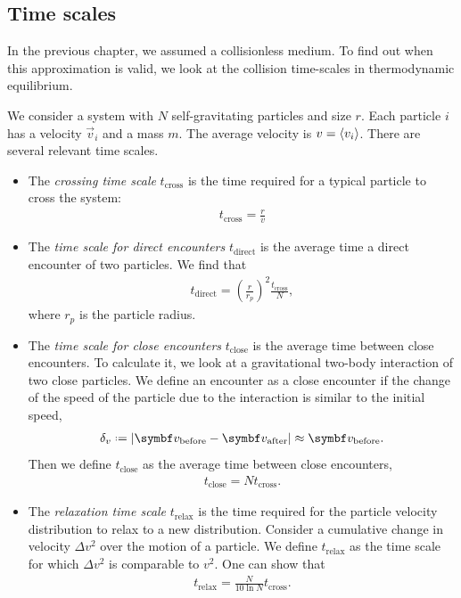 \subsection{Time scales}
\label{ssec:time-scales}

In the previous chapter, we assumed a collisionless medium. To find out when this approximation is valid, we look at the collision time-scales in thermodynamic equilibrium.

We consider a system with $N$ self-gravitating particles and size $r$.
Each particle $i$ has a velocity $\vec{v}_i$ and a mass $m$. The average velocity is $v = \left\langle v_i \right\rangle$.
There are several relevant time scales.
\begin{itemize}
	\item The \emph{crossing time scale} $t_\text{cross}$ is the time required for a typical particle to cross the system:
	\begin{align*}
		t_\text{cross} = \frac{r}{v}
	\end{align*}

	\item The \emph{time scale for direct encounters} $t_\text{direct}$ is the average time a direct encounter of two particles. We find that 
	\begin{align*}
		t_\text{direct}
		=  \left( \frac{r}{r_p} \right) ^2\frac{t_\text{cross}}{N},
	\end{align*}
	where $r_p$ is the particle radius. 
	\item The \emph{time scale for close encounters} $t_\text{close}$ is the average time between close encounters.
	To calculate it, we look at a gravitational two-body interaction of two close particles.
	We define an encounter as a close encounter if the change of the speed of the particle due to the interaction is similar to the initial speed,
	\begin{align*}
		\delta_v
		\defeq \abs*{\vec{v}_\text{before} - \vec{v}_\text{after}}
		\approx \vec{v}_\text{before}.
	\end{align*}
	Then we define $t_\text{close}$ as the average time between close encounters,
	\begin{align*}
		t_\text{close}
		= N t_\text{cross}.
	\end{align*}

	\item The \emph{relaxation time scale} $t_\text{relax}$ is the time required for the particle velocity distribution to relax to a new distribution.
	Consider a cumulative change in velocity $\Delta v^2$ over the motion of a particle.
	We define $t_\text{relax}$ as the time scale for which $\Delta v^2$ is comparable to $v^2$. One can show that
	\begin{align*}
		t_\text{relax}
		= \frac{N}{10 \ln N} t_\text{cross}.
	\end{align*}
\end{itemize}

